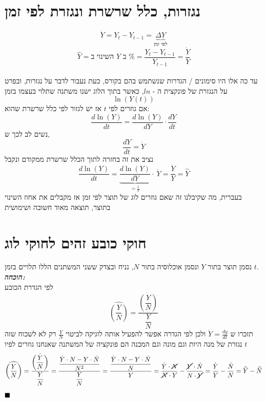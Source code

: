 \documentclass[a4paper,12pt]{article}
\renewcommand{\qed}{\hfill\blacksquare}
\begin{document}
\begin{RTL}
\begin{hebrew}
\section{נגזרות, כלל שרשרת ונגזרת לפי זמן}
\begin{equation*}
    \dot Y = Y_t - Y_{t-1 } = \underbrace{\Delta Y}_{\text{לפי זמן}}
\end{equation*}
\begin{equation*}
    \hat Y = \text{השינוי ב $Y$  ב \%} = \frac{Y_t - Y_{t-1}}{Y_{t-1}} = \frac{\dot Y}{Y}
\end{equation*}
\\
עד כה אלו היו סימונים / הגדרות שנשתמש בהם בקורס, כעת נעבור לדבר על נגזרות, ובפרט על הנגזרת של פונקצית 
 ה - $ln$, כאשר בתוך הלוג ישנו משתנה שתלוי בעצמו בזמן
\begin{equation*}
    \ln (Y(t))
\end{equation*}
אם גוזרים לפי $t$ אז יש לגזור לפי כלל שרשרת שהוא:
\begin{equation*}
\frac{d \ln (Y)}{dt} = \frac{d \ln (Y)}{dY} \cdot \frac{dY}{dt}
\end{equation*}
נשים לב לכך ש,
\begin{equation*}
    \frac{dY}{dt} = \dot Y
\end{equation*}
נציב את זה בחזרה לתוך הכלל שרשרת ממקודם ונקבל 
\begin{equation*}
    \frac{d \ln (Y)}{dt} =\underbrace{ \frac{d \ln (Y)}{dY}}_{ = \frac{1}{Y}} \cdot \  \dot Y = \frac{\dot Y }{Y} = \hat Y
\end{equation*}
בעברית, מה שקיבלנו זה שאם גוזרים לוג של תוצר לפי זמן אז מקבלים את אחוז השינוי בתוצר, תוצאה מאוד חשובה ושימושית

\section{חוקי כובע זהים לחוקי לוג}
נסמן תוצר בתור $Y$ ונסמן אוכלוסיה בתור $N$, נניח ובצדק ששני המשתנים הללו תלויים בזמן $t$. \\
\textbf{\textit{הוכחה:}} \\
לפי הגדרת הכובע
\begin{equation*}
    \widehat{ \left(\frac{Y}{N}\right)} = \dfrac{\dot{\left(\dfrac{Y}{N}\right)}}{\dfrac{Y}{N}}
\end{equation*}
תזכרו ש $\dot Y = \frac{dy}{dt}$ ולכן לפי הגדרה אפשר להפעיל אותה לוגיקה לביטוי $\frac{Y}{N}$  רק לא לשכוח שזה נגזרת של מנה היות וגם מונה וגם המכנה הם פונקציה של המשתנה שאנחנו גוזרים לפיו $t$
\begin{equation*}
\widehat{\left(\frac{Y}{N}\right)}=\dfrac{\dot{\left(\dfrac{Y}{N}\right)}}{\dfrac{Y}{N}}=\dfrac{\dfrac{\dot{Y} \cdot N-Y \cdot \dot{N}}{N^2}}{\dfrac{Y}{{N}}}=\dfrac{\dfrac{\dot{Y} \cdot N-Y \cdot \dot{N}}{N}}{Y}=\dfrac{\dot{Y} \cdot \cancel{N}}{\cancel{N} \cdot Y}-\dfrac{\cancel{Y} \cdot \dot{N}}{N \cdot \cancel{Y}}=\dfrac{\dot{Y}}{Y}-\dfrac{\dot{N}}{N}=\widehat{Y}-\widehat{N}
\end{equation*}
$\qed$

\end{hebrew}
\end{RTL}
\end{document}
